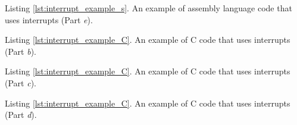 \newpage
\begin{center} \begin{minipage}[h]{16 cm}
\expandparam

\end{minipage} \end{center}
\begin{center}
Listing \ref{lst:interrupt_example_s}. An example of assembly language code that uses
interrupts (Part {\it e}).
\end{center}

\newpage

\begin{center} \begin{minipage}[h]{16.5 cm}

\end{minipage} \end{center}
\newpage

\begin{center} \begin{minipage}[h]{15 cm}

\end{minipage} \end{center}
\begin{center}
Listing \ref{lst:interrupt_example_C}. An example of C code that uses interrupts (Part {\it b}).
\end{center}
\newpage

\begin{center} \begin{minipage}[h]{15 cm}

\end{minipage} \end{center}
\begin{center}
Listing \ref{lst:interrupt_example_C}. An example of C code that uses interrupts (Part {\it c}).
\end{center}
\newpage

\begin{center} \begin{minipage}[h]{15 cm}

\end{minipage} \end{center}
\begin{center}
Listing \ref{lst:interrupt_example_C}. An example of C code that uses interrupts (Part {\it d}).
\end{center}
\newpage

